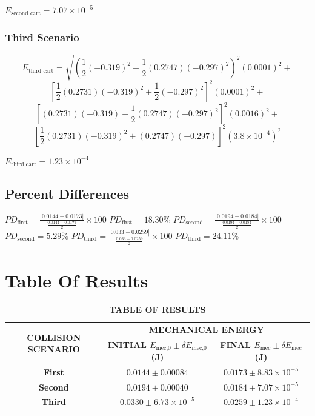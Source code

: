 \documentclass{article}
\begin{document}
$E_{\text{second cart}} = 7.07 \times 10^{-5}$



\subsubsection{Third Scenario}

\[
E_{\text{third cart}} = \sqrt{
    \left( \frac{1}{2} \left( -0.319 \right)^2 + \frac{1}{2} \left( 0.2747 \right) \left( -0.297 \right)^2 \right)^2 \left( 0.0001 \right)^2 +
}
\]
\[
\left[
    \frac{1}{2} \left( 0.2731 \right) \left( -0.319 \right)^2 + \frac{1}{2} \left( -0.297 \right)^2
\right]^2 \left( 0.0001 \right)^2 +
\]
\[
\left[
    \left( 0.2731 \right) \left( -0.319 \right) + \frac{1}{2} \left( 0.2747 \right) \left( -0.297 \right)^2
\right]^2 \left( 0.0016 \right)^2 +
\]
\[
\left[
    \frac{1}{2} \left( 0.2731 \right) \left( -0.319 \right)^2 + \left( 0.2747 \right) \left( -0.297 \right)
\right]^2 \left( 3.8 \times 10^{-4} \right)^2
\]

$E_{\text{third cart}} = 1.23 \times 10^{-4}$
\subsection{Percent Differences}
$PD_{\text {first}}=\frac{|0.0144-0.0173|}{\frac{0.0144+0.0173}{2}}\times 100 $
\newline
$PD_{\text {first}}=18.30\%$
\newline
\newline
$PD_{\text {second}}=\frac{|0.0194-0.0184|}{\frac{0.0194+0.0184}{2}}\times 100 $
\newline
$PD_{\text {second}}= 5.29 \%$
\newline 
\newline
$PD_{\text {third}}=\frac{|0.033-0.0259|}{\frac{0.033+0.0259}{2}}\times 100 $
\newline
$PD_{\text {third}}=24.11 \%$
\section{Table Of Results}

\begin{table}[h!]
\centering
\caption*{\textbf{TABLE OF RESULTS}}
\begin{tabular}{|c|c|c|}
\hline
\multirow{2}{*}{\textbf{COLLISION SCENARIO}} & \multicolumn{2}{c|}{\textbf{MECHANICAL ENERGY}} \\ \cline{2-3} 
 & \textbf{INITIAL $E_{\text{mec,0}} \pm \delta E_{\text{mec,0}}$ (J)} & \textbf{FINAL $E_{\text{mec}} \pm \delta E_{\text{mec}}$ (J)} \\ \hline
\textbf{First} & $0.0144 \pm 0.00084$ & $0.0173 \pm 8.83 \times 10^{-5}$ \\ \hline
\textbf{Second} & $0.0194 \pm 0.00040$ & $0.0184 \pm 7.07 \times 10^{-5}$ \\ \hline
\textbf{Third} & $0.0330 \pm 6.73 \times 10^{-5}$ & $0.0259 \pm 1.23 \times 10^{-4}$ \\ \hline
\end{tabular}
\end{table}
\end{document}
